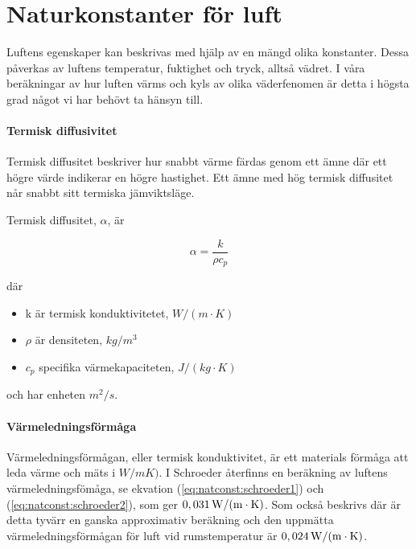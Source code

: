 \section{Naturkonstanter för luft}
Luftens egenskaper kan beskrivas med hjälp av en mängd olika konstanter. Dessa påverkas av luftens temperatur, fuktighet och tryck, alltså vädret. I våra beräkningar av hur luften värms  och kyls av olika väderfenomen är detta i högsta grad något vi har behövt ta hänsyn till.


\paragraph{Termisk diffusivitet}

Termisk diffusitet beskriver hur snabbt värme färdas genom ett ämne där ett högre värde indikerar en högre hastighet. Ett ämne med hög termisk diffusitet når snabbt sitt termiska jämviktsläge.

Termisk diffusitet, $\alpha$, är \cite{termiskdiffusivitet}

\begin{equation}
\alpha=\frac{k}{\rho c_p}
\end{equation}

där 
\begin{itemize}
   \item[] k är termisk konduktivitetet, $\unit{W/(m\cdot K)}$
   \item[] $\rho$ är densiteten, $\unit{kg/m^3}$
   \item[] $c_p$ specifika värmekapaciteten, $\unit{J/(kg\cdot K)}$
\end{itemize}

och har enheten $\unit{m^2/s}$.




\paragraph{Värmeledningsförmåga} %
Värmeledningsförmågan, eller termisk konduktivitet, är ett materials förmåga att leda värme och mäts i $\unit{W/ mK)}$. I Schroeder \cite{schroeder00} återfinns en beräkning av luftens värmeledningsfömåga, se ekvation (\ref{eq:natconst:schroeder1}) och (\ref{eq:natconst:schroeder2}), som ger $\unit[0,031]{W/(m\cdot K)}$. Som också beskrivs där är detta tyvärr en ganska approximativ beräkning och den uppmätta värmeledningsförmågan för luft vid rumstemperatur är $\unit[0,024]{W/(m\cdot K)}$.


